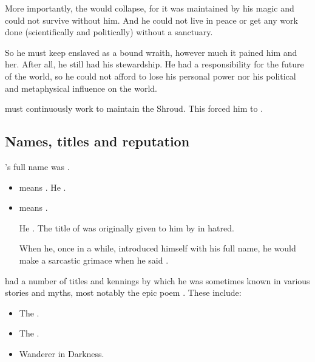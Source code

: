 More importantly, the  would collapse, for it was maintained by his magic and could not survive without him.
And he could not live in peace or get any work done (scientifically and politically) without a sanctuary.

So he must keep \Rystessakhin enslaved as a bound wraith, however much it pained him and her.
After all, he still had his stewardship.
He had a responsibility for the future of the world, so he could not afford to lose his personal power nor his political and metaphysical influence on the world.

\Ishnaruchaefir must continuously work to maintain the Shroud. 
This forced him to . 










\subsection{Names, titles and reputation}
\Ishnaruchaefir's full name was \Quessanth \Melechet \Nierzshah \Tzeorossh \Ishnaruchaefir.

\begin{itemize}
  \item 
    \quo{\Nierzshah} means .
    He . 
  \item 
    \quo{\Tzeorossh} means .
    
    He . 
    The title of  was originally given to him by \Secherdamon in hatred.
    
    When he, once in a while, introduced himself with his full name, he would make a sarcastic grimace when he said \quo{\Tzeorossh}.
\end{itemize}

\Ishnaruchaefir{} had a number of titles and kennings by which he was sometimes known in various stories and myths, most notably the epic poem \emph{}. 
These include:

\begin{itemize}
  \item The .
  \item The .
  \item Wanderer in Darkness. 
\end{itemize}






